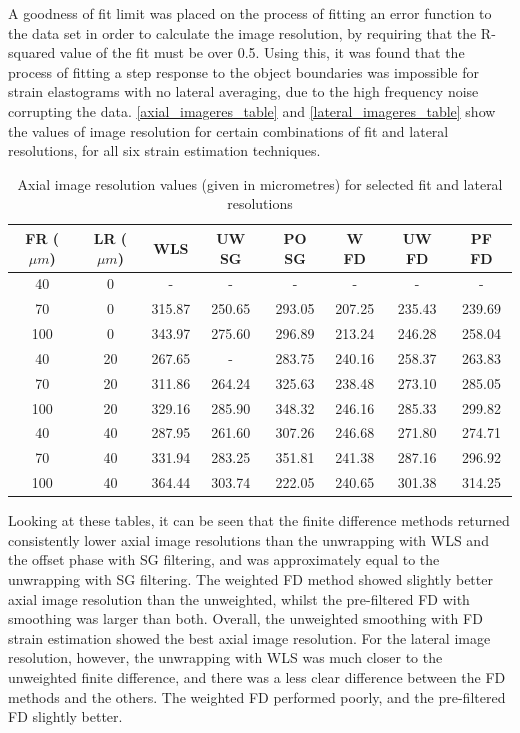 A goodness of fit limit was placed on the process of fitting an error function to the data set in order to calculate the image resolution, by requiring that the R-squared value of the fit must be over 0.5. Using this, it was found that the process of fitting a step response to the object boundaries was impossible for strain elastograms with no lateral averaging, due to the high frequency noise corrupting the data. \autoref{axial_imageres_table} and \autoref{lateral_imageres_table} show the values of image resolution for certain combinations of fit and lateral resolutions, for all six strain estimation techniques.

\begin{table}[b!]
	\begin{center}
		\begin{tabular}{|c||c||c|c|c|c|c|c|}
			\hline 
			FR ($\mu m$) & LR ($\mu m$) & WLS & UW SG & PO SG & W FD & UW FD & PF FD \\
			\hline
			\hline
			40 & 0 & - & - & - & - & - & - \\
			\hline
			70 & 0 & 315.87 & 250.65 & 293.05 & 207.25 & 235.43 & 239.69 \\
			\hline
			100 & 0 & 343.97 & 275.60 & 296.89 & 213.24 & 246.28 & 258.04 \\
			\hline
			40 & 20 & 267.65 & - & 283.75 & 240.16 & 258.37 & 263.83 \\
			\hline
			70 & 20 & 311.86 & 264.24 & 325.63 & 238.48 & 273.10 & 285.05 \\
			\hline
			100 & 20 &  329.16 & 285.90 & 348.32 & 246.16 & 285.33 & 299.82 \\
			\hline
			40 & 40 & 287.95 & 261.60 & 307.26 &  246.68 & 271.80 & 274.71 \\
			\hline
			70 & 40 & 331.94 & 283.25 & 351.81 & 241.38 & 287.16 & 296.92 \\
			\hline
			100 & 40 & 364.44 & 303.74 & 222.05 &  240.65 & 301.38 & 314.25 \\
			\hline
		\end{tabular}
	\end{center}
	\caption{Axial image resolution values (given in micrometres) for selected fit and lateral resolutions}
	\label{axial_imageres_table}
\end{table}


Looking at these tables, it can be seen that the finite difference methods returned consistently lower axial image resolutions than the unwrapping with WLS and the offset phase with SG filtering, and was approximately equal to the unwrapping with SG filtering. The weighted FD method showed slightly better axial image resolution than the unweighted, whilst the pre-filtered FD with smoothing was larger than both. Overall, the unweighted smoothing with FD strain estimation showed the best axial image resolution. 
For the lateral image resolution, however, the unwrapping with WLS was much closer to the unweighted finite difference, and there was a less clear difference between the FD methods and the others. The weighted FD performed poorly, and the pre-filtered FD slightly better. 

